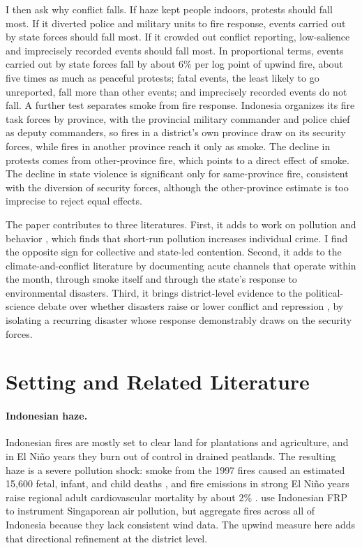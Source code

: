 \documentclass[12pt]{article}
\begin{document}
I then ask why conflict falls. If haze kept people indoors, protests should fall most. If it diverted police and military units to fire response, events carried out by state forces should fall most. If it crowded out conflict reporting, low-salience and imprecisely recorded events should fall most. In proportional terms, events carried out by state forces fall by about 6\% per log point of upwind fire, about five times as much as peaceful protests; fatal events, the least likely to go unreported, fall more than other events; and imprecisely recorded events do not fall. A further test separates smoke from fire response. Indonesia organizes its fire task forces by province, with the provincial military commander and police chief as deputy commanders, so fires in a district's own province draw on its security forces, while fires in another province reach it only as smoke. The decline in protests comes from other-province fire, which points to a direct effect of smoke. The decline in state violence is significant only for same-province fire, consistent with the diversion of security forces, although the other-province estimate is too imprecise to reject equal effects.

The paper contributes to three literatures. First, it adds to work on pollution and behavior \citep{herrnstadt2021, bondyrothsager2020, burkhardt2019}, which finds that short-run pollution increases individual crime. I find the opposite sign for collective and state-led contention. Second, it adds to the climate-and-conflict literature by documenting acute channels that operate within the month, through smoke itself and through the state's response to environmental disasters. Third, it brings district-level evidence to the political-science debate over whether disasters raise or lower conflict and repression \citep{nelrigharts2008, slettebak2012, woodwright2016}, by isolating a recurring disaster whose response demonstrably draws on the security forces.

\section{Setting and Related Literature}
\label{sec:lit}

\paragraph{Indonesian haze.} Indonesian fires are mostly set to clear land for plantations and agriculture, and in El Ni\~{n}o years they burn out of control in drained peatlands. The resulting haze is a severe pollution shock: smoke from the 1997 fires caused an estimated 15,600 fetal, infant, and child deaths \citep{jayachandran2009}, and fire emissions in strong El Ni\~{n}o years raise regional adult cardiovascular mortality by about 2\% \citep{marlier2013}. \citet{sheldonsankaran2017} use Indonesian FRP to instrument Singaporean air pollution, but aggregate fires across all of Indonesia because they lack consistent wind data. The upwind measure here adds that directional refinement at the district level.
\end{document}
